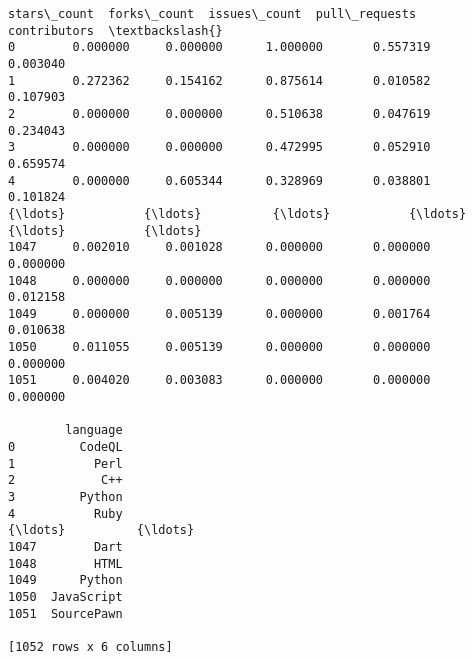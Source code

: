 \documentclass[11pt]{article}
\makeatletter
\newcommand{\boxspacing}{\kern\kvtcb@left@rule\kern\kvtcb@boxsep}
\newcommand{\prompt}[4]{
        {\ttfamily\llap{{\color{#2}[#3]:\hspace{3pt}#4}}\vspace{-\baselineskip}}
    }
\makeatother
\begin{document}
            \begin{tcolorbox}[breakable, size=fbox, boxrule=.5pt, pad at break*=1mm, opacityfill=0]
\prompt{Out}{outcolor}{17}{\boxspacing}
\begin{Verbatim}[commandchars=\\\{\}]
      stars\_count  forks\_count  issues\_count  pull\_requests  contributors  \textbackslash{}
0        0.000000     0.000000      1.000000       0.557319      0.003040
1        0.272362     0.154162      0.875614       0.010582      0.107903
2        0.000000     0.000000      0.510638       0.047619      0.234043
3        0.000000     0.000000      0.472995       0.052910      0.659574
4        0.000000     0.605344      0.328969       0.038801      0.101824
{\ldots}           {\ldots}          {\ldots}           {\ldots}            {\ldots}           {\ldots}
1047     0.002010     0.001028      0.000000       0.000000      0.000000
1048     0.000000     0.000000      0.000000       0.000000      0.012158
1049     0.000000     0.005139      0.000000       0.001764      0.010638
1050     0.011055     0.005139      0.000000       0.000000      0.000000
1051     0.004020     0.003083      0.000000       0.000000      0.000000

        language
0         CodeQL
1           Perl
2            C++
3         Python
4           Ruby
{\ldots}          {\ldots}
1047        Dart
1048        HTML
1049      Python
1050  JavaScript
1051  SourcePawn

[1052 rows x 6 columns]
\end{Verbatim}
\end{tcolorbox}
        
\end{document}
